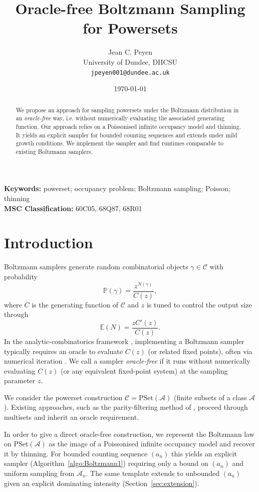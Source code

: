 \documentclass[a4paper,10pt]{article}
\title{Oracle-free Boltzmann Sampling for Powersets}
\author{Jean C. Peyen\\University of Dundee, DIICSU\\\texttt{jpeyen001@dundee.ac.uk}}
\date{\today}
\theoremstyle{definition}
\newcommand{\PP}{\mathbb{P}}
\newcommand{\EE}{\mathbb{E}}
\newcommand{\Aa}{\mathcal{A}}
\newcommand{\Cc}{\mathcal{C}}
\newcommand{\PSet}{\mathrm{PSet}}
\begin{document}
\maketitle

\begin{abstract}
We propose an approach for sampling powersets under the Boltzmann distribution in an \emph{oracle-free} way, i.e. without numerically evaluating the associated generating function. Our approach relies on a Poissonised infinite occupancy model and thinning. It yields an explicit sampler for bounded counting sequences and extends under mild growth conditions. We implement the sampler and find runtimes comparable to existing Boltzmann samplers.
\end{abstract}

\noindent\textbf{Keywords:} powerset; occupancy problem; Boltzmann sampling; Poisson; thinning\\
\noindent\textbf{MSC Classification:} 60C05, 68Q87, 68R01

\section{Introduction}
Boltzmann samplers \cite{Duchon} generate random combinatorial objects $\gamma\in\Cc$ with probability
\begin{equation}
    \PP(\gamma) = \frac{z^{N(\gamma)}}{C(z)},
\end{equation}
where $C$ is the generating function of $\Cc$ and $z$ is tuned to control the output size through
\begin{equation}\label{eq:tuning}
    \EE(N)= \frac{z C'(z)}{C(z)}.
\end{equation}
In the analytic-combinatorics framework \cite{anacomb}, implementing a Boltzmann sampler typically requires an oracle to evaluate $C(z)$ (or related fixed points), often via numerical iteration \cite{Pivoteau}. We call a sampler \emph{oracle-free} if it runs without numerically evaluating $C(z)$ (or any equivalent fixed-point system) at the sampling parameter $z$.

We consider the powerset construction $\Cc=\PSet(\Aa)$ (finite subsets of a class $\Aa$). Existing approaches, such as the parity-filtering method of \cite{Flajolet}, proceed through multisets and inherit an oracle requirement.

In  order to give a direct oracle-free construction, we represent the Boltzmann law on $\PSet(\Aa)$ as the image of a Poissonised infinite occupancy model and recover it by thinning. For bounded counting sequence $(a_n)$ this yields an explicit sampler (Algorithm~\ref{algo:Boltzmann1}) requiring only a bound on $(a_n)$ and uniform sampling from $\Aa_n$. The same template extends to unbounded $(a_n)$ given an explicit dominating intensity (Section~\ref{sec:extension}).
\end{document}
